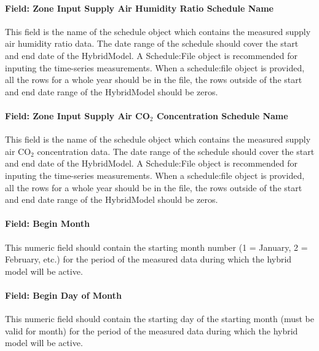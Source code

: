 \paragraph{Field: Zone Input Supply Air Humidity Ratio Schedule Name}\label{field-zone-input-supply-air-humidity-ratio-schedule-name-hm}

This field is the name of the schedule object which contains the measured supply air humidity ratio data. The date range of the schedule should cover the start and end date of the HybridModel. A Schedule:File object is recommended for inputing the time-series measurements. When a schedule:file object is provided, all the rows for a whole year should be in the file, the rows outside of the start and end date range of the HybridModel should be zeros.

\paragraph{Field: Zone Input Supply Air CO$_2$ Concentration Schedule Name}\label{field-zone-input-supply-air-co2-concentration-schedule-name-hm}

This field is the name of the schedule object which contains the measured supply air CO$_2$ concentration data. The date range of the schedule should cover the start and end date of the HybridModel. A Schedule:File object is recommended for inputing the time-series measurements. When a schedule:file object is provided, all the rows for a whole year should be in the file, the rows outside of the start and end date range of the HybridModel should be zeros.

\paragraph{Field: Begin Month}\label{field-begin-month-hm}

This numeric field should contain the starting month number (1 = January, 2 = February, etc.) for the period of the measured data during which the hybrid model will be active.

\paragraph{Field: Begin Day of Month}\label{field-begin-day-of-month-hm}

This numeric field should contain the starting day of the starting month (must be valid for month) for the period of the measured data during which the hybrid model will be active.

